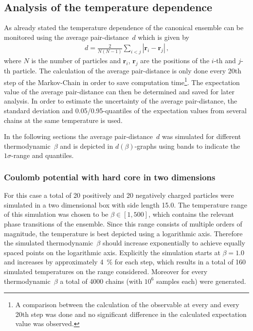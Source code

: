 \documentclass[11pt, a4paper]{article}
\numberwithin{equation}{section}
\begin{document}
\subsection{Analysis of the temperature dependence} \label{sec:Temp_Dep}
As already stated the temperature dependence of the canonical ensemble can be monitored using the average pair-distance~$d$ which is given by
\begin{align*}
d = \frac{2}{N(N - 1)} \sum_{i<j} |\mathbf{r}_i - \mathbf{r}_j | \, \text{,}
\end{align*}
where $N$ is the number of particles and $\mathbf{r}_i$, $\mathbf{r}_j$ are the positions of the $i$-th and $j$-th particle.
The calculation of the average pair-distance is only done every 20th step of the Markov-Chain in order to save computation time\footnote{A comparison between the calculation of the observable at every and every 20th step was done and no significant difference in the calculated expectation value was observed.}.
The expectation value of the average pair-distance can then be determined and saved for later analysis.
In order to estimate the uncertainty of the average pair-distance, the standard deviation and 0.05/0.95-quantiles of the expectation values from several chains at the same temperature is used.

In the following sections the average pair-distance~$d$ was simulated for different thermodynamic~$\beta$ and is depicted in $d(\beta)$-graphs using bands to indicate the $1\sigma$-range and quantiles.

\subsubsection{Coulomb potential with hard core in two dimensions} \label{sec:2d_coulomb_tempdep}
For this case a total of 20 positively and 20 negatively charged particles were simulated in a two dimensional box with side length 15.0.
The temperature range of this simulation was chosen to be $\beta \in [1, 500]$, which contains the relevant phase transitions of the ensemble.
Since this range consists of multiple orders of magnitude, the temperature is best depicted using a logarithmic axis.
Therefore the simulated thermodynamic~$\beta$ should increase exponentially to achieve equally spaced points on the logarithmic axis.
Explicitly the simulation starts at $\beta = 1.0$ and increases by approximately \SI{4}{\percent} for each step, which results in a total of 160 simulated temperatures on the range considered.
Moreover for every thermodynamic~$\beta$ a total of \num{4000} chains (with $10^6$ samples each) were generated.
\end{document}
